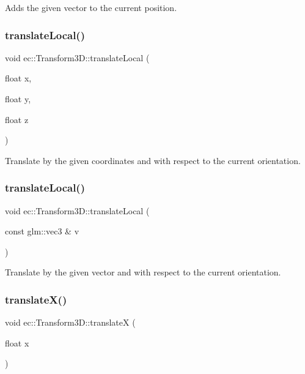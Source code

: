 Adds the given vector to the current position. \mbox{\label{classec_1_1_transform3_d_aa32ee07603a9531e77b189185cbd40e4}} 
\subsubsection{\texorpdfstring{translate\+Local()}{translateLocal()}\hspace{0.1cm}{\footnotesize\ttfamily [1/2]}}
{\footnotesize\ttfamily void ec\+::\+Transform3\+D\+::translate\+Local (\begin{DoxyParamCaption}\item[{float}]{x,  }\item[{float}]{y,  }\item[{float}]{z }\end{DoxyParamCaption})}

Translate by the given coordinates and with respect to the current orientation. \mbox{\label{classec_1_1_transform3_d_a8769dc2eb4f1cd467d8e39c85decdd10}} 
\subsubsection{\texorpdfstring{translate\+Local()}{translateLocal()}\hspace{0.1cm}{\footnotesize\ttfamily [2/2]}}
{\footnotesize\ttfamily void ec\+::\+Transform3\+D\+::translate\+Local (\begin{DoxyParamCaption}\item[{const glm\+::vec3 \&}]{v }\end{DoxyParamCaption})}

Translate by the given vector and with respect to the current orientation. \mbox{\label{classec_1_1_transform3_d_a6e8e6da470c6a080b669cd619e8554ef}} 
\subsubsection{\texorpdfstring{translate\+X()}{translateX()}}
{\footnotesize\ttfamily void ec\+::\+Transform3\+D\+::translateX (\begin{DoxyParamCaption}\item[{float}]{x }\end{DoxyParamCaption})}

